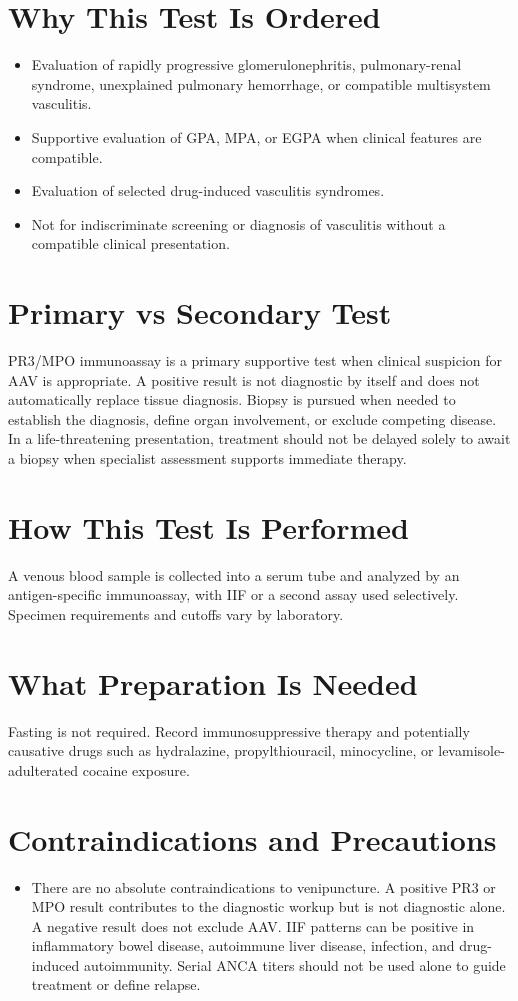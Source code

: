 \section*{Why This Test Is Ordered}
\begin{itemize}
  \item Evaluation of rapidly progressive glomerulonephritis, pulmonary-renal syndrome, unexplained pulmonary hemorrhage, or compatible multisystem vasculitis.
  \item Supportive evaluation of GPA, MPA, or EGPA when clinical features are compatible.
  \item Evaluation of selected drug-induced vasculitis syndromes.
  \item Not for indiscriminate screening or diagnosis of vasculitis without a compatible clinical presentation.
\end{itemize}

\section*{Primary vs Secondary Test}
PR3/MPO immunoassay is a primary supportive test when clinical suspicion for AAV is appropriate. A positive result is not diagnostic by itself and does not automatically replace tissue diagnosis. Biopsy is pursued when needed to establish the diagnosis, define organ involvement, or exclude competing disease. In a life-threatening presentation, treatment should not be delayed solely to await a biopsy when specialist assessment supports immediate therapy.

\section*{How This Test Is Performed}
A venous blood sample is collected into a serum tube and analyzed by an antigen-specific immunoassay, with IIF or a second assay used selectively. Specimen requirements and cutoffs vary by laboratory.

\section*{What Preparation Is Needed}
Fasting is not required. Record immunosuppressive therapy and potentially causative drugs such as hydralazine, propylthiouracil, minocycline, or levamisole-adulterated cocaine exposure.

\section*{Contraindications and Precautions}
\begin{itemize}
  \item There are no absolute contraindications to venipuncture. A positive PR3 or MPO result contributes to the diagnostic workup but is not diagnostic alone. A negative result does not exclude AAV. IIF patterns can be positive in inflammatory bowel disease, autoimmune liver disease, infection, and drug-induced autoimmunity. Serial ANCA titers should not be used alone to guide treatment or define relapse.
\end{itemize}
